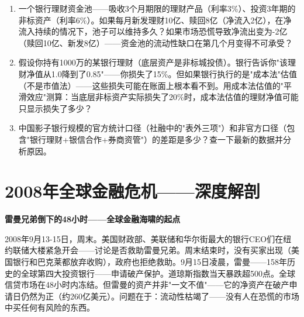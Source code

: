 \documentclass[a4paper,11pt]{ctexbook}
\begin{document}
\begin{exercises}
\begin{enumerate}
  \item 一个银行理财资金池——吸收3个月期限的理财产品（利率3\%）、投资3年期的非标资产（利率6\%）。如果每月新发理财10亿、赎回8亿（净流入2亿），在净流入持续的情况下，池子可以维持多久？如果市场恐慌导致净流出变为-2亿（赎回10亿、新发8亿）——资金池的流动性缺口在第几个月变得不可承受？
  \item 假设你持有1000万的某银行理财（底层资产是非标城投债）。银行告诉你"该理财净值从1.0降到了0.85"——你损失了15\%。但如果银行执行的是"成本法"估值（不是市值法）——这些损失可能在账面上根本看不到。用成本法估值的"平滑效应"测算：当底层非标资产实际损失了20\%时，成本法估值的理财净值可能只显示损失了多少？
  \item 中国影子银行规模的官方统计口径（社融中的"表外三项"）和非官方口径（包含"银行理财+银信合作+券商资管"）的差距是多少？查一下最新的数据并分析原因。
\end{enumerate}
\end{exercises}


\newpage
\chapter{2008年全球金融危机——深度解剖}

\begin{scenario}
\textbf{雷曼兄弟倒下的48小时——全球金融海啸的起点}

2008年9月13-15日，周末。美国财政部、美联储和华尔街最大的银行CEO们在纽约联储大楼紧急开会——讨论是否救助雷曼兄弟。周末结束时，没有买家出现（美国银行和巴克莱都放弃收购），政府也拒绝救助。9月15日凌晨，雷曼——158年历史的全球第四大投资银行——申请破产保护。道琼斯指数当天暴跌超500点。全球信贷市场在48小时内冻结。但雷曼的资产并非"一文不值"——它的净资产在破产申请日仍然为正（约260亿美元）。问题在于：流动性枯竭了——没有人在恐慌的市场中买任何有风险的东西。
\end{scenario}
\end{document}
